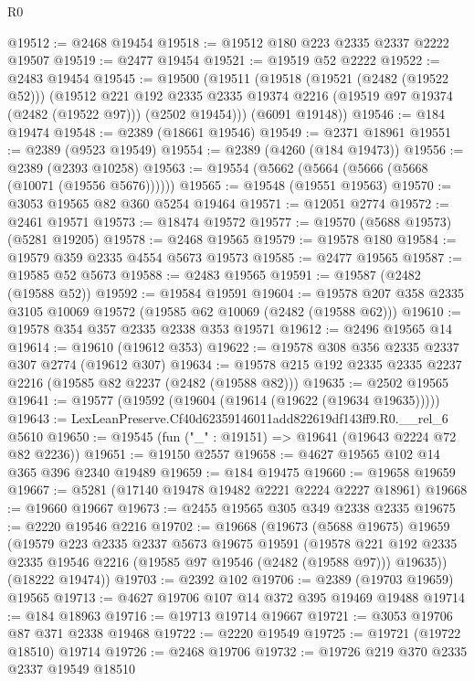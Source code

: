\begin{lexlean}{R0}
\begin{coremodule}
@19512 := @2468 @19454
@19518 := @19512 @180 @223 @2335 @2337 @2222 @19507
@19519 := @2477 @19454
@19521 := @19519 @52 @2222
@19522 := @2483 @19454
@19545 := @19500
    (@19511
      (@19518
        (@19521 (@2482 (@19522 @52)))
        (@19512
          @221
          @192
          @2335
          @2335
          @19374
          @2216
          (@19519 @97 @19374 (@2482 (@19522 @97)))
          (@2502 @19454)))
      (@6091 @19148))
@19546 := @184 @19474
@19548 := @2389 (@18661 @19546)
@19549 := @2371 @18961
@19551 := @2389 (@9523 @19549)
@19554 := @2389 (@4260 (@184 @19473))
@19556 := @2389 (@2393 @10258)
@19563 := @19554 (@5662 (@5664 (@5666 (@5668 (@10071 (@19556 @5676))))))
@19565 := @19548 (@19551 @19563)
@19570 := @3053 @19565 @82 @360 @5254 @19464
@19571 := @12051 @2774
@19572 := @2461 @19571
@19573 := @18474 @19572
@19577 := @19570 (@5688 @19573) (@5281 @19205)
@19578 := @2468 @19565
@19579 := @19578 @180
@19584 := @19579 @359 @2335 @4554 @5673 @19573
@19585 := @2477 @19565
@19587 := @19585 @52 @5673
@19588 := @2483 @19565
@19591 := @19587 (@2482 (@19588 @52))
@19592 := @19584 @19591
@19604 := @19578 @207 @358 @2335 @3105 @10069 @19572 (@19585 @62 @10069 (@2482 (@19588 @62)))
@19610 := @19578 @354 @357 @2335 @2338 @353 @19571
@19612 := @2496 @19565 @14
@19614 := @19610 (@19612 @353)
@19622 := @19578 @308 @356 @2335 @2337 @307 @2774 (@19612 @307)
@19634 := @19578 @215 @192 @2335 @2335 @2237 @2216 (@19585 @82 @2237 (@2482 (@19588 @82)))
@19635 := @2502 @19565
@19641 := @19577 (@19592 (@19604 (@19614 (@19622 (@19634 @19635)))))
@19643 := LexLeanPreserve.Cf40d62359146011add822619df143ff9.R0.__rel_6 @5610
@19650 := @19545 (fun ("_" : @19151) => @19641 (@19643 @2224 @72 @82 @2236))
@19651 := @19150 @2557
@19658 := @4627 @19565 @102 @14 @365 @396 @2340 @19489
@19659 := @184 @19475
@19660 := @19658 @19659
@19667 := @5281 (@17140 @19478 @19482 @2221 @2224 @2227 @18961)
@19668 := @19660 @19667
@19673 := @2455 @19565 @305 @349 @2338 @2335
@19675 := @2220 @19546 @2216
@19702 := @19668
    (@19673
      (@5688 @19675)
      @19659
      (@19579
        @223
        @2335
        @2337
        @5673
        @19675
        @19591
        (@19578 @221 @192 @2335 @2335 @19546 @2216 (@19585 @97 @19546 (@2482 (@19588 @97))) @19635))
      (@18222 @19474))
@19703 := @2392 @102
@19706 := @2389 (@19703 @19659) @19565
@19713 := @4627 @19706 @107 @14 @372 @395 @19469 @19488
@19714 := @184 @18963
@19716 := @19713 @19714 @19667
@19721 := @3053 @19706 @87 @371 @2338 @19468
@19722 := @2220 @19549
@19725 := @19721 (@19722 @18510) @19714
@19726 := @2468 @19706
@19732 := @19726 @219 @370 @2335 @2337 @19549 @18510

\end{coremodule}
\end{lexlean}
